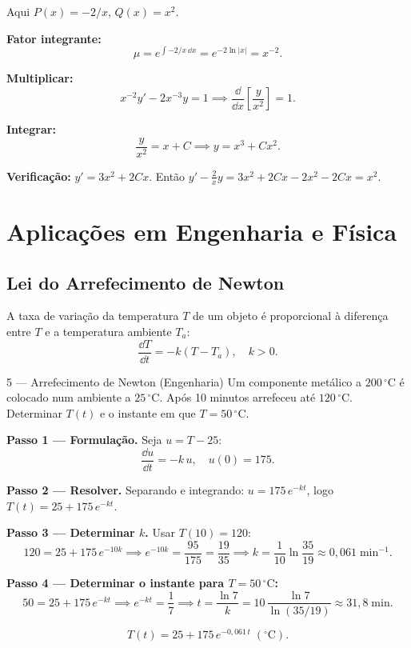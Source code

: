 \begin{solbox}
  Aqui $P(x) = -2/x$, $Q(x)=x^2$.

  \textbf{Fator integrante:}
  \[
    \mu = e^{\int -2/x\,\dd x} = e^{-2\ln|x|} = x^{-2}.
  \]

  \textbf{Multiplicar:}
  \[
    x^{-2}y' - 2x^{-3}y = 1
    \implies \frac{\dd}{\dd x}\!\left[\frac{y}{x^2}\right] = 1.
  \]

  \textbf{Integrar:}
  \[
    \frac{y}{x^2} = x + C
    \implies \boxed{y = x^3 + Cx^2.}
  \]

  \textbf{Verificação:} $y'=3x^2+2Cx$. Então
  $y' - \tfrac{2}{x}y = 3x^2+2Cx - 2x^2 - 2Cx = x^2$. \checkmark
\end{solbox}

\section{Aplicações em Engenharia e Física}
\label{sec:applications5}

\subsection{Lei do Arrefecimento de Newton}

\begin{defbox}[title={Modelo de Arrefecimento de Newton}]
  A taxa de variação da temperatura $T$ de um objeto é proporcional à diferença
  entre $T$ e a temperatura ambiente $T_a$:
  \[
    \frac{\dd T}{\dd t} = -k(T - T_a), \quad k > 0.
  \]
\end{defbox}

\begin{exbox}{5 --- Arrefecimento de Newton (Engenharia)}
  Um componente metálico a $200\,^{\circ}\mathrm{C}$ é colocado num ambiente a
  $25\,^{\circ}\mathrm{C}$. Após 10 minutos arrefeceu até $120\,^{\circ}\mathrm{C}$.
  Determinar $T(t)$ e o instante em que $T = 50\,^{\circ}\mathrm{C}$.
\end{exbox}

\begin{solbox}
  \textbf{Passo 1 --- Formulação.} Seja $u = T - 25$:
  \[
    \frac{\dd u}{\dd t} = -k\,u, \quad u(0)=175.
  \]

  \textbf{Passo 2 --- Resolver.} Separando e integrando:
  $u = 175\,e^{-kt}$, logo $T(t) = 25 + 175\,e^{-kt}$.

  \textbf{Passo 3 --- Determinar $k$.} Usar $T(10)=120$:
  \[
    120 = 25 + 175\,e^{-10k}
    \implies e^{-10k} = \frac{95}{175} = \frac{19}{35}
    \implies k = \frac{1}{10}\ln\!\frac{35}{19} \approx 0{,}061\;\mathrm{min}^{-1}.
  \]

  \textbf{Passo 4 --- Determinar o instante para $T=50\,^{\circ}\mathrm{C}$:}
  \[
    50 = 25 + 175\,e^{-kt}
    \implies e^{-kt} = \frac{1}{7}
    \implies t = \frac{\ln 7}{k}
               = 10\,\frac{\ln 7}{\ln(35/19)} \approx 31{,}8\;\mathrm{min}.
  \]

  \[
    \boxed{T(t) = 25 + 175\,e^{-0{,}061\,t}\;(^{\circ}\mathrm{C}).}
  \]
\end{solbox}

